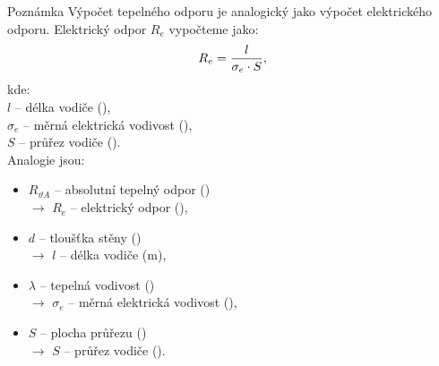 \documentclass{article}
\begin{document}
\begin{notebox}{Poznámka}
    Výpočet tepelného odporu je analogický jako výpočet elektrického odporu. Elektrický odpor $R_e$ vypočteme jako:
    \begin{equation}
        R_e = \frac{l}{\sigma_e \cdot S},
        \unit{(\ueqOHM)}
    \end{equation}
    kde:\\
    $l$ -- délka vodiče (\ueqM),\\
    $\sigma_e$ -- měrná elektrická vodivost (\ueqSIEandMinv),\\
    $S$ -- průřez vodiče (\ueqMsq).\\

    Analogie jsou:
    \begin{itemize}
        \item $R_{\vartheta A}$ -- absolutní tepelný odpor (\ueqKandWinv)\\ $\rightarrow$ $R_e$ -- elektrický odpor (\ueqOHM),
        \item $d$ -- tloušťka stěny (\ueqM)\\ $\rightarrow$ $l$ -- délka vodiče (m),
        \item $\lambda$ -- tepelná vodivost (\ueqWandMinvKinv)\\ $\rightarrow$ $\sigma_e$ -- měrná elektrická vodivost (\ueqSIEandMinv),
        \item $S$ -- plocha průřezu (\ueqMsq)\\ $\rightarrow$ $S$ -- průřez vodiče (\ueqMsq).
    \end{itemize}
\end{notebox}
\end{document}
